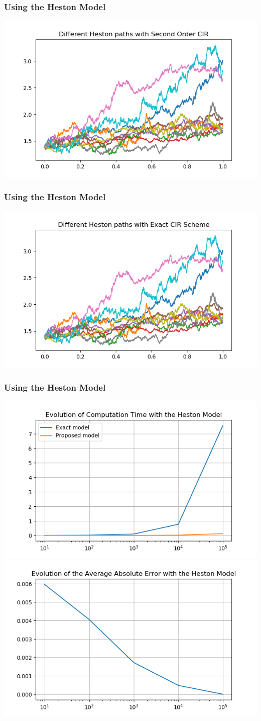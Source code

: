 \documentclass[12pt]{beamer}
\begin{document}
\begin{frame}
\frametitle{Using the Heston Model}
\includegraphics[width=\textwidth]{heston_cir21000.png}
\end{frame}

\begin{frame}
\frametitle{Using the Heston Model}
\includegraphics[width=\textwidth]{heston_exact1000.png}
\end{frame}

\begin{frame}
\frametitle{Using the Heston Model}
\includegraphics[width=.5\textwidth]{heston_time.png}
\includegraphics[width=.5\textwidth]{heston_error.png}
\end{frame}
\end{document}
